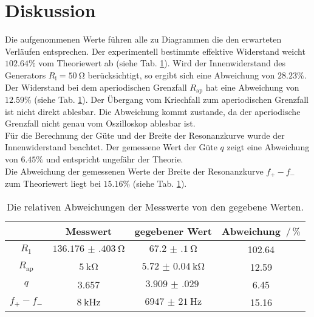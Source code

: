 \section{Diskussion}
\label{sec:Diskussion}

Die aufgenommenen Werte führen alle zu Diagrammen die den erwarteten Verläufen entsprechen.
Der experimentell bestimmte effektive Widerstand weicht $102.64 \%$ vom Theoriewert ab (siehe Tab. \ref{tab:fehler}).
Wird der Innenwiderstand des Generators $R_\text{i}=\SI{50}{\ohm}$ berücksichtigt, so ergibt sich eine Abweichung von $28.23 \%$.
\\
Der Widerstand bei dem aperiodischen Grenzfall $R_\text{ap}$ hat eine Abweichung von $12.59 \%$ (siehe Tab. \ref{tab:fehler}).
Der Übergang vom Kriechfall zum aperiodischen Grenzfall ist nicht direkt ablesbar.
Die Abweichung kommt zustande, da der aperiodische Grenzfall nicht genau vom Oszilloskop ablesbar ist.
\\
Für die Berechnung der Güte und der Breite der Resonanzkurve wurde der Innenwiderstand beachtet.
Der gemessene Wert der Güte $q$ zeigt eine Abweichung von $6.45 \%$ und entspricht ungefähr der Theorie.
\\
Die Abweichung der gemessenen Werte der Breite der Resonanzkurve $f_+ - f_-$ zum Theoriewert liegt bei $15.16 \%$ (siehe Tab. \ref{tab:fehler}).
\\

\begin{table}
\centering
\caption{Die relativen Abweichungen der Messwerte von den gegebene Werten.}
\begin{tabular}{cccc}
\toprule
 & Messwert & gegebener Wert & Abweichung $ \,/\, \%$ \\
\midrule
$R_1$ &  $\SI{136.176(403)}{\ohm}$ & $\SI{67.2(1)}{\ohm}$ & 102.64 \\
$R_\text{ap}$ & $\SI{5}{\kilo\ohm}$ & $\SI{5.72(4)}{\kilo\ohm}$ & 12.59 \\
$q$ & 3.657 & $\SI{3.909(029)}{}$ & 6.45 \\
$f_{+}- f_{-}$ & $\SI{8}{\kilo\hertz}$ & $\SI{6947(21)}{\hertz}$ & 15.16 \\
\bottomrule
\end{tabular}
\label{tab:fehler}
\end{table}